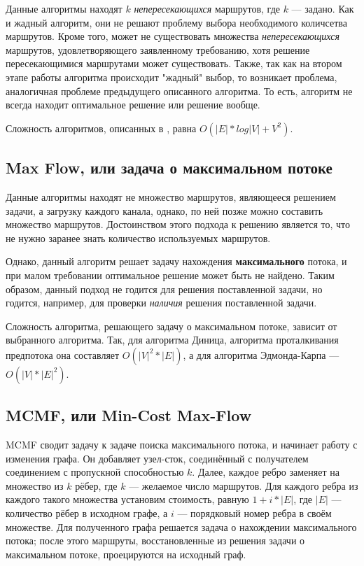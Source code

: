 \documentclass[a4paper]{article}
\begin{document}
Данные алгоритмы находят $k$ \textit{непересекающихся} маршрутов, где $k$ --- задано. Как и жадный алгоритм, они не решают проблему выбора необходимого количсетва маршрутов. Кроме того, может не существовать множества \textit{непересекающихся} маршрутов, удовлетворяющего заявленному требованию, хотя решение пересекающимися маршрутами может существовать. Также, так как на втором этапе работы алгоритма происходит "жадный" выбор, то возникает проблема, аналогичная проблеме предыдущего описанного алгоритма. То есть, алгоритм не всегда находит оптимальное решение или решение вообще.

Сложность алгоритмов, описанных в \cite{kmaxmin1, kmaxmin2}, равна  $O(|E|*log|V| + V^2)$.

\subsection{Max Flow, или задача о максимальном потоке}
Данные алгоритмы находят не множество маршрутов, являющееся решением задачи, а загрузку каждого канала, однако, по ней позже можно составить множество маршрутов. Достоинством этого подхода к решению является то, что не нужно заранее знать количество используемых маршрутов. 

Однако, данный алгоритм решает задачу нахождения \textbf{максимального} потока, и при малом требовании оптимальное решение может быть не найдено. 
Таким образом, данный подход не годится для решения поставленной задачи, но годится, например, для проверки \textit{наличия} решения поставленной задачи.

Сложность алгоритма, решающего задачу о максимальном потоке, зависит от выбранного алгоритма. Так, для алгоритма Диница, алгоритма проталкивания предпотока она составляет $O(|V|^2*|E|)$, а для алгоритма Эдмонда-Карпа --- $O(|V|*|E|^2)$.

\subsection{MCMF, или Min-Cost Max-Flow\cite{stepsmel}}
MCMF сводит задачу к задаче поиска максимального потока, и начинает работу с изменения графа. Он добавляет узел-сток, соединённый с получателем соединением с пропускной способностью $k$. Далее, каждое ребро заменяет на множество из $k$ рёбер, где $k$ --- желаемое число маршрутов. Для каждого ребра из каждого такого множества установим стоимость, равную $1+i*|E|$, где $|E|$ --- количество рёбер в исходном графе, а $i$ --- порядковый номер ребра в своём множестве. 
Для полученного графа решается задача о нахождении максимального потока; после этого маршруты, восстановленные из решения задачи о максимальном потоке, проецируются на исходный граф.
\end{document}
